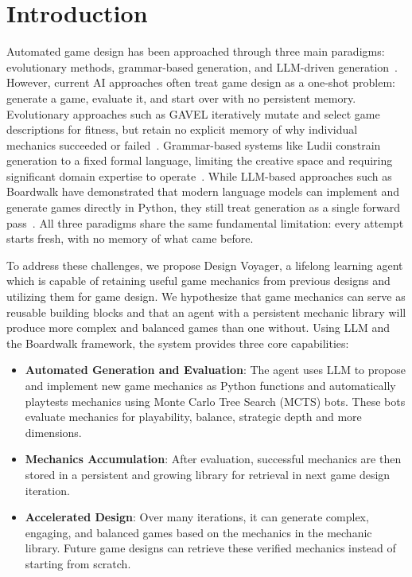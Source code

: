 \documentclass[conference]{IEEEtran}
\begin{document}
\section{Introduction}
Automated game design has been approached through three main paradigms: evolutionary methods, grammar-based generation, and LLM-driven generation~\cite{maleki2024procedural}. However, current AI approaches often treat game design as a one-shot problem: generate a game, evaluate it, and start over with no persistent memory. Evolutionary approaches such as GAVEL iteratively mutate and select game descriptions for fitness, but retain no explicit memory of why individual mechanics succeeded or failed~\cite{todd2024gavel}. Grammar-based systems like Ludii constrain generation to a fixed formal language, limiting the creative space and requiring significant domain expertise to operate~\cite{piette2019ludii}. While LLM-based approaches such as Boardwalk have demonstrated that modern language models can implement and generate games directly in Python, they still treat generation as a single forward pass~\cite{becker2025boardwalk}. All three paradigms share the same fundamental limitation: every attempt starts fresh, with no memory of what came before.

To address these challenges, we propose Design Voyager, a lifelong learning agent which is capable of retaining useful game mechanics from previous designs and utilizing them for game design. We hypothesize that game mechanics can serve as reusable building blocks and that an agent with a persistent mechanic library will produce more complex and balanced games than one without. Using LLM and the Boardwalk framework, the system provides three core capabilities:
\begin{itemize}
    \item \textbf{Automated Generation and Evaluation}: The agent uses LLM to propose and implement new game mechanics as Python functions and automatically playtests mechanics using Monte Carlo Tree Search (MCTS) bots. These bots evaluate mechanics for playability, balance, strategic depth and more dimensions.
    \item \textbf{Mechanics Accumulation}: After evaluation, successful mechanics are then stored in a persistent and growing library for retrieval in next game design iteration.
    \item \textbf{Accelerated Design}: Over many iterations, it can generate complex, engaging, and balanced games based on the mechanics in the mechanic library. Future game designs can retrieve these verified mechanics instead of starting from scratch.
\end{itemize}
\end{document}
